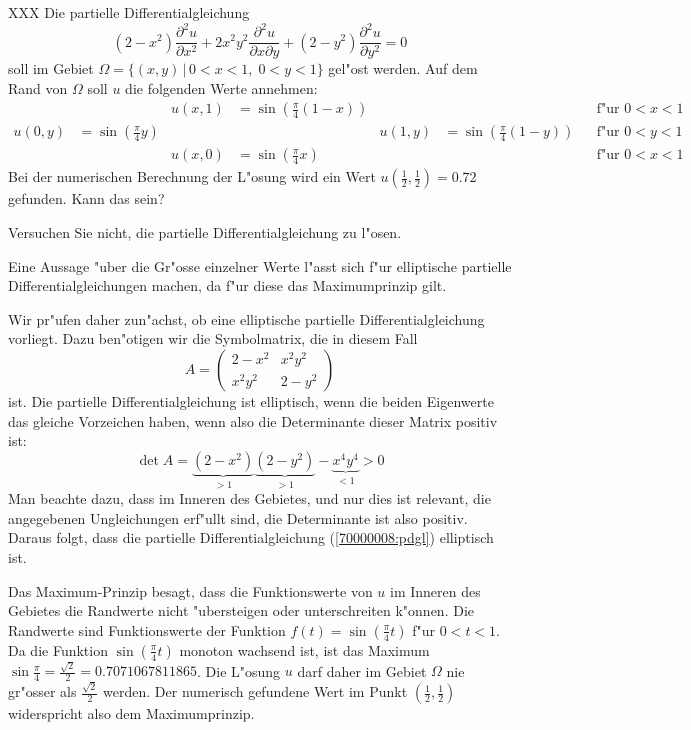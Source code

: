 XXX
Die partielle Differentialgleichung
\begin{equation}
(2-x^2)\frac{\partial^2 u}{\partial x^2}
+
2x^2y^2\frac{\partial^2 u}{\partial x\partial y}
+
(2-y^2)\frac{\partial^2 u}{\partial y^2}
=0
\label{70000008:pdgl}
\end{equation}
soll im Gebiet $\Omega=\{(x,y)\,|\, 0< x<1,\; 0<y<1\}$ gel"ost
werden. Auf dem Rand von $\Omega$ soll $u$ die folgenden Werte
annehmen:
\begin{align*}
&
	&u(x,1)&=\sin({\textstyle\frac\pi4}(1-x))
		&&
			&&\text{f"ur $0<x<1$}\\
u(0,y)&=\sin({\textstyle\frac\pi4}y)
	&&
		&u(1,y)&=\sin({\textstyle\frac\pi4}(1-y))
			&&\text{f"ur $0<y<1$}\\
&
	&u(x,0)&=\sin({\textstyle\frac\pi4} x)
		&&                
			&&\text{f"ur $0<x<1$}
\end{align*}
Bei der numerischen Berechnung der L"osung wird ein Wert
$u(\frac12,\frac12)=0.72$ gefunden. Kann das sein?

\begin{hinweis}
Versuchen Sie nicht, die partielle Differentialgleichung zu l"osen.
\end{hinweis}

\begin{loesung}
Eine Aussage "uber die Gr"osse einzelner Werte l"asst sich f"ur
elliptische partielle Differentialgleichungen machen, da f"ur diese das
Maximumprinzip gilt.

Wir pr"ufen daher zun"achst, ob eine elliptische
partielle Differentialgleichung vorliegt. Dazu ben"otigen wir die
Symbolmatrix, die in diesem Fall 
\[
A=\begin{pmatrix}
2-x^2 &x^2y^2\\
x^2y^2&2-y^2
\end{pmatrix}
\]
ist. Die partielle Differentialgleichung ist elliptisch, wenn die
beiden Eigenwerte das gleiche Vorzeichen haben, wenn also die Determinante
dieser Matrix positiv ist:
\[
\det A=\underbrace{(2-x^2)}_{> 1}\underbrace{(2-y^2)}_{> 1}-\underbrace{x^4y^4}_{< 1}>0
\]
Man beachte dazu, dass im Inneren des Gebietes, und nur dies ist relevant,
die angegebenen Ungleichungen erf"ullt sind, die Determinante ist also
positiv.
Daraus folgt, dass die partielle Differentialgleichung (\ref{70000008:pdgl})
elliptisch ist.

Das Maximum-Prinzip besagt, dass die Funktionswerte von $u$ im Inneren
des Gebietes die Randwerte nicht "ubersteigen oder unterschreiten
k"onnen. Die Randwerte sind Funktionswerte der Funktion $f(t)=\sin(\frac\pi4t)$
f"ur $0<t<1$. Da die Funktion $\sin(\frac\pi4t)$ monoton wachsend ist, ist das
Maximum $\sin\frac\pi4=\frac{\sqrt{2}}2=0.7071067811865$.
Die L"osung $u$ darf daher im Gebiet $\Omega$ nie gr"osser als
$\frac{\sqrt{2}}2$ werden. Der numerisch gefundene Wert im Punkt
$(\frac12,\frac12)$ widerspricht also dem Maximumprinzip.
\end{loesung}

